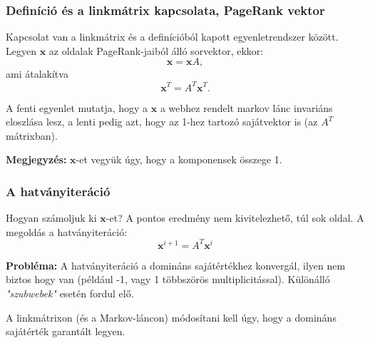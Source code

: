 \documentclass[]{beamer}
\newcommand{\bx}{\mathbf{x}}
\begin{document}
\begin{frame}
	\frametitle{Definíció és a linkmátrix kapcsolata, PageRank vektor}
	
	Kapcsolat van a linkmátrix és a definícióból kapott egyenletrendszer között. Legyen $\bx$ az oldalak PageRank-jaiból álló sorvektor, ekkor:
	\[ 
	\bx = \bx A, 
	\]
	ami átalakítva
	\[
	\bx^T = A^T \bx^T. 
	\]
	
	A fenti egyenlet mutatja, hogy a $\bx$ a webhez rendelt markov lánc invariáns eloszlása lesz, a lenti pedig azt, hogy az 1-hez
	tartozó sajátvektor is (az $A^T$ mátrixban).
	
	\bigskip
	\textbf{Megjegyzés:} $\bx$-et vegyük úgy, hogy a komponensek összege 1.
\end{frame}

\begin{frame}
	\frametitle{A hatványiteráció}
	
	Hogyan számoljuk ki $\bx$-et? A pontos eredmény nem kivitelezhető, túl sok oldal. A megoldás a hatványiteráció:
	\[ \bx^{i+1} = A^T \bx^i \]
	
	\textbf{Probléma:} A hatványiteráció a domináns sajátértékhez konvergál, ilyen nem biztos hogy van (például -1, vagy 1 többszörös multiplicitással). Különálló \textit{"szubwebek"} esetén fordul elő.
	
	\bigskip
	A linkmátrixon (és a Markov-láncon) módosítani kell úgy, hogy a domináns sajátérték garantált legyen.
\end{frame}
\end{document}
